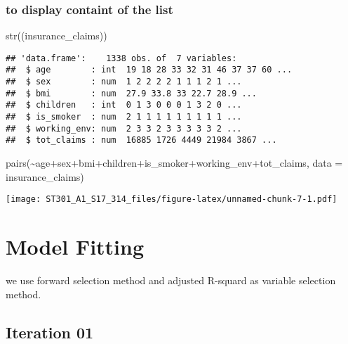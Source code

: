 \documentclass[
]{article}
\newenvironment{Shaded}{\begin{snugshade}}{\end{snugshade}}
\newcommand{\AttributeTok}[1]{\textcolor[rgb]{0.77,0.63,0.00}{#1}}
\newcommand{\FunctionTok}[1]{\textcolor[rgb]{0.00,0.00,0.00}{#1}}
\newcommand{\NormalTok}[1]{#1}
\newcommand{\SpecialCharTok}[1]{\textcolor[rgb]{0.00,0.00,0.00}{#1}}
\begin{document}
\hypertarget{to-display-containt-of-the-list}{%
\subsubsection{to display containt of the
list}\label{to-display-containt-of-the-list}}

\begin{Shaded}
\begin{Highlighting}[]
\FunctionTok{str}\NormalTok{((insurance\_claims))}
\end{Highlighting}
\end{Shaded}

\begin{verbatim}
## 'data.frame':    1338 obs. of  7 variables:
##  $ age        : int  19 18 28 33 32 31 46 37 37 60 ...
##  $ sex        : num  1 2 2 2 2 1 1 1 2 1 ...
##  $ bmi        : num  27.9 33.8 33 22.7 28.9 ...
##  $ children   : int  0 1 3 0 0 0 1 3 2 0 ...
##  $ is_smoker  : num  2 1 1 1 1 1 1 1 1 1 ...
##  $ working_env: num  2 3 3 2 3 3 3 3 3 2 ...
##  $ tot_claims : num  16885 1726 4449 21984 3867 ...
\end{verbatim}

\begin{Shaded}
\begin{Highlighting}[]
\FunctionTok{pairs}\NormalTok{(}\SpecialCharTok{\textasciitilde{}}\NormalTok{age}\SpecialCharTok{+}\NormalTok{sex}\SpecialCharTok{+}\NormalTok{bmi}\SpecialCharTok{+}\NormalTok{children}\SpecialCharTok{+}\NormalTok{is\_smoker}\SpecialCharTok{+}\NormalTok{working\_env}\SpecialCharTok{+}\NormalTok{tot\_claims, }\AttributeTok{data =}\NormalTok{ insurance\_claims)}
\end{Highlighting}
\end{Shaded}

\texttt{[image: ST301\_A1\_S17\_314\_files/figure-latex/unnamed-chunk-7-1.pdf]}

\hypertarget{model-fitting}{%
\section{Model Fitting}\label{model-fitting}}

we use forward selection method and adjusted R-squard as variable
selection method.

\hypertarget{iteration-01}{%
\subsection{Iteration 01}\label{iteration-01}}
\end{document}
